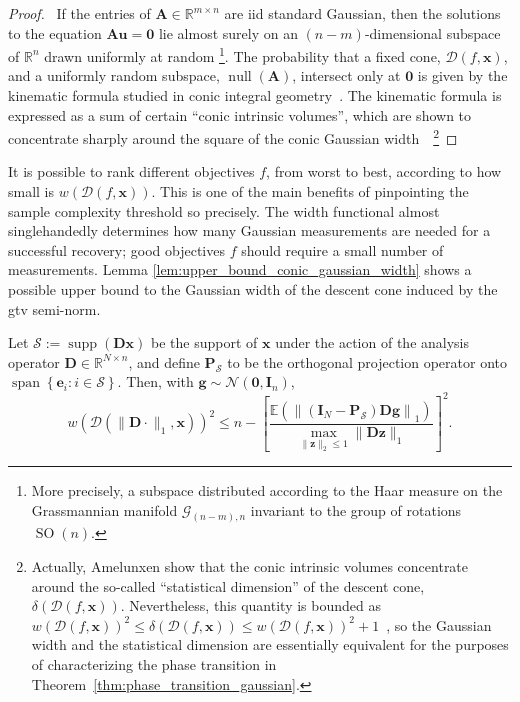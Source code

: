 \begin{proof}
    \pfsketch\ If the entries of $\mathbf{A} \in \mathbb{R}^{m \times n}$ are \acrshort{iid} standard Gaussian, then the solutions to the equation $\mathbf{A u} = \mathbf{0}$ lie almost surely on an $(n - m)$-dimensional subspace of $\mathbb{R}^{n}$ drawn uniformly at random \footnote{More precisely, a subspace distributed according to the Haar measure on the Grassmannian manifold $\mathcal{G}_{(n-m),n}$ invariant to the group of rotations $\operatorname{SO}(n)$.}. The probability that a fixed cone, $\mathcal{D}(f, \mathbf{x})$, and a uniformly random subspace, $\operatorname{null} \left ( \mathbf{A} \right )$, intersect only at $\mathbf{0}$ is given by the kinematic formula studied in conic integral geometry~\cite{schneider2008}. The kinematic formula is expressed as a sum of certain ``conic intrinsic volumes'', which are shown to concentrate sharply around the square of the conic Gaussian width~\cite{amelunxen2014}~\footnote{Actually, Amelunxen \etal show that the conic intrinsic volumes concentrate around the so-called ``statistical dimension'' of the descent cone, $\delta(\mathcal{D}(f, \mathbf{x}))$. Nevertheless, this quantity is bounded as $w(\mathcal{D}(f, \mathbf{x}))^2 \leq \delta(\mathcal{D}(f, \mathbf{x})) \leq w(\mathcal{D}(f, \mathbf{x}))^2 + 1$~\cite[Prop. 10.2]{amelunxen2014}, so the Gaussian width and the statistical dimension are essentially equivalent for the purposes of characterizing the phase transition in Theorem~\ref{thm:phase_transition_gaussian}.}
\end{proof}

It is possible to rank different objectives $f$, from worst to best, according to how small is $w(\mathcal{D}(f, \mathbf{x}))$. This is one of the main benefits of pinpointing the sample complexity threshold so precisely. The width functional almost singlehandedly determines how many Gaussian measurements are needed for a successful recovery; good objectives $f$ should require a small number of measurements. Lemma \ref{lem:upper_bound_conic_gaussian_width} shows a possible upper bound to the Gaussian width of the descent cone induced by the \acrshort{gtv} semi-norm.

\begin{lemma}\label{lem:upper_bound_conic_gaussian_width}
    Let $\mathcal{S} := \operatorname{supp}\left ( \mathbf{Dx} \right )$ be the support of $\mathbf{x}$ under the action of the analysis operator $\mathbf{D} \in \mathbb{R}^{N \times n}$, and define $\mathbf{P}_\mathcal{S}$ to be the orthogonal projection operator onto $\operatorname{span}\left \{ \mathbf{e}_i : i \in \mathcal{S} \right \}$. Then, with $\mathbf{g} \sim \mathcal{N}(\mathbf{0}, \mathbf{I}_n)$,
    \begin{equation}
        w(\mathcal{D}(\|\mathbf{D} \cdot \|_1, \mathbf{x}))^2 \leq n - \left [ \frac{\mathbb{E} \left ( \left \|(\mathbf{I}_N - \mathbf{P}_\mathcal{S}) \mathbf{Dg} \right \|_1 \right )}{\underset{\|\mathbf{z}\|_2 \leq 1}{\max} \| \mathbf{Dz} \|_1} \right ]^2.
        \label{eq:upper_bound_gaussian_width_gtv}
    \end{equation}
\end{lemma}

